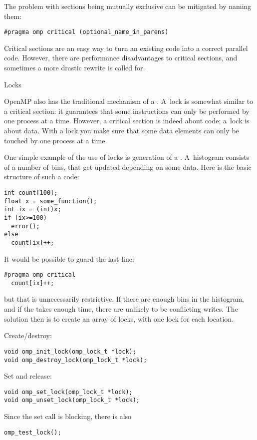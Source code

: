 The problem with  sections being mutually exclusive can be mitigated by naming them:
\begin{lstlisting}
#pragma omp critical (optional_name_in_parens)
\end{lstlisting}

Critical sections are an easy way to turn an existing code into a correct parallel code.
However, there are performance disadvantages to critical sections,
and sometimes a more drastic rewrite
is called for.


 {Locks}
\label{sec:ompref:locks}

OpenMP also has the traditional mechanism of a . A~lock is somewhat similar to 
a critical section: it guarantees that some instructions can only be performed by one
process at a time. However, a critical section is indeed about code; a~lock is about data.
With a lock you make sure that some data elements can only be touched by one process at a time.

One simple example of the use of locks is generation of a .
A~histogram consists of a number of bins, that get updated depending on some data.
Here is the basic structure of such a code:
\begin{lstlisting}
int count[100];
float x = some_function();
int ix = (int)x;
if (ix>=100)
  error();
else
  count[ix]++;
\end{lstlisting}
It would be possible to guard the last line:
\begin{lstlisting}
#pragma omp critical
  count[ix]++;
\end{lstlisting}
but that is unnecessarily restrictive. If there are enough bins in the
histogram, and if the  takes enough time, there are unlikely to be
conflicting writes. The solution then is to create an array of locks, with
one lock for each  location.

Create/destroy:
\begin{lstlisting}
void omp_init_lock(omp_lock_t *lock);
void omp_destroy_lock(omp_lock_t *lock);
\end{lstlisting}
Set and release:
\begin{lstlisting}
void omp_set_lock(omp_lock_t *lock);
void omp_unset_lock(omp_lock_t *lock);
\end{lstlisting}
Since the set call is blocking, there is also 
\begin{lstlisting}
omp_test_lock();
\end{lstlisting}

